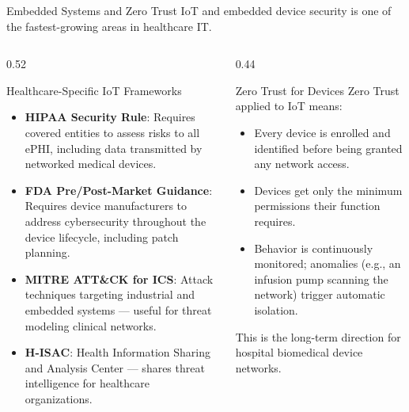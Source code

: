 \documentclass[aspectratio=169]{beamer}  %
\begin{document}
\begin{frame}{Embedded Systems and Zero Trust}
    \footnotesize
    IoT and embedded device security is one of the fastest-growing areas in healthcare IT.

    \vspace{0.3em}
    \begin{columns}[T]
        \begin{column}{0.52\textwidth}
            \begin{block}{Healthcare-Specific IoT Frameworks}
                \footnotesize
                \begin{itemize}
                    \item \textbf{HIPAA Security Rule}: Requires covered entities to assess risks to all ePHI, including data transmitted by networked medical devices.
                    \item \textbf{FDA Pre/Post-Market Guidance}: Requires device manufacturers to address cybersecurity throughout the device lifecycle, including patch planning.
                    \item \textbf{MITRE ATT\&CK for ICS}: Attack techniques targeting industrial and embedded systems --- useful for threat modeling clinical networks.
                    \item \textbf{H-ISAC}: Health Information Sharing and Analysis Center --- shares threat intelligence for healthcare organizations.
                \end{itemize}
            \end{block}
        \end{column}
        \begin{column}{0.44\textwidth}
            \begin{block}{Zero Trust for Devices}
                \footnotesize
                Zero Trust applied to IoT means:
                \begin{itemize}
                    \item Every device is enrolled and identified before being granted any network access.
                    \item Devices get only the minimum permissions their function requires.
                    \item Behavior is continuously monitored; anomalies (e.g., an infusion pump scanning the network) trigger automatic isolation.
                \end{itemize}
                This is the long-term direction for hospital biomedical device networks.
            \end{block}
        \end{column}
    \end{columns}
\end{frame}
\end{document}
